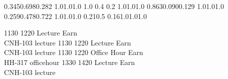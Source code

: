 
\noindent{}

\setslotsize{3.1cm}{0.5cm}
\settextframe{0.8mm}




    {0.345}{0.698}{0.282} {1.0}{1.0}{1.0}
    {1.0} {0.4} {0.2} {1.0}{1.0}{1.0}
 {0.863}{0.090}{0.129} {1.0}{1.0}{1.0}
   {0.259}{0.478}{0.722} {1.0}{1.0}{1.0}
       {0.21}{0.5} {0.16}{1.0}{1.0}{1.0}

\begin{timetable}
   {1130} {1220} {Lecture}        {Earn\\CNH-103}   {}      {lecture}
   {1130} {1220} {Lecture}        {Earn\\CNH-103}   {}      {lecture}
   {1130} {1220} {Office Hour}    {Earn\\HH-317}    {}      {officehour}
   {1330} {1420} {Lecture}        {Earn\\CNH-103}   {}      {lecture}
\end{timetable}
